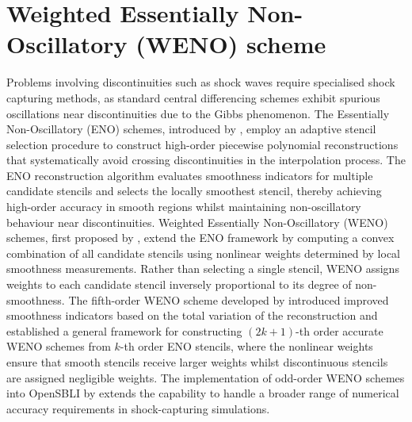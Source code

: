 \section{Weighted Essentially Non-Oscillatory (WENO) scheme}

Problems involving discontinuities such as shock waves require specialised shock capturing methods, as standard central differencing schemes exhibit spurious oscillations near discontinuities due to the Gibbs phenomenon. The Essentially Non-Oscillatory (ENO) schemes, introduced by \citet{HartenEtAl1987}, employ an adaptive stencil selection procedure to construct high-order piecewise polynomial reconstructions that systematically avoid crossing discontinuities in the interpolation process. The ENO reconstruction algorithm evaluates smoothness indicators for multiple candidate stencils and selects the locally smoothest stencil, thereby achieving high-order accuracy in smooth regions whilst maintaining non-oscillatory behaviour near discontinuities. Weighted Essentially Non-Oscillatory (WENO) schemes, first proposed by \citet{LiuEtAl1994}, extend the ENO framework by computing a convex combination of all candidate stencils using nonlinear weights determined by local smoothness measurements. Rather than selecting a single stencil, WENO assigns weights to each candidate stencil inversely proportional to its degree of non-smoothness. The fifth-order WENO scheme developed by \citet{JiangShu1996} introduced improved smoothness indicators based on the total variation of the reconstruction and established a general framework for constructing $(2k+1)$-th order accurate WENO schemes from $k$-th order ENO stencils, where the nonlinear weights ensure that smooth stencils receive larger weights whilst discontinuous stencils are assigned negligible weights. The implementation of odd-order WENO schemes into OpenSBLI by \citet{LusherEtAl2025} extends the capability to handle a broader range of numerical accuracy requirements in shock-capturing simulations.

